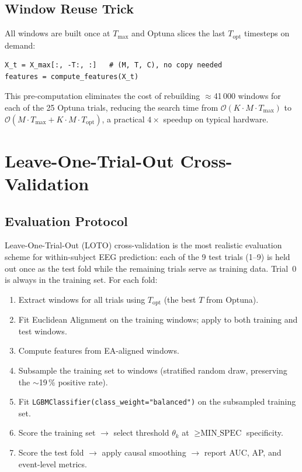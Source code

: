 \documentclass[12pt,a4paper]{article}
\begin{document}
\subsection{Window Reuse Trick}

All windows are built once at $T_{\max}$ and Optuna slices the last
$T_{\text{opt}}$ timesteps on demand:

\begin{lstlisting}[style=pycode]
X_t = X_max[:, -T:, :]   # (M, T, C), no copy needed
features = compute_features(X_t)
\end{lstlisting}

This pre-computation eliminates the cost of rebuilding
$\approx$41\,000 windows for each of the 25 Optuna trials, reducing the
search time from $\mathcal{O}(K \cdot M \cdot T_{\max})$ to
$\mathcal{O}(M \cdot T_{\max} + K \cdot M \cdot T_{\text{opt}})$, a
practical $4\times$ speedup on typical hardware.

\section{Leave-One-Trial-Out Cross-Validation}

\subsection{Evaluation Protocol}

Leave-One-Trial-Out (LOTO) cross-validation is the most realistic
evaluation scheme for within-subject EEG prediction: each of the 9 test
trials (1--9) is held out once as the test fold while the remaining trials
serve as training data. Trial~0 is always in the training set. For each fold:

\begin{enumerate}[leftmargin=1.5em]
  \item Extract windows for all trials using $T_{\text{opt}}$ (the best $T$
        from Optuna).
  \item Fit Euclidean Alignment on the training windows; apply to both
        training and test windows.
  \item Compute features from EA-aligned windows.
  \item Subsample the training set to  windows
        (stratified random draw, preserving the $\sim$19\,\% positive rate).
  \item Fit \texttt{LGBMClassifier(class\_weight="balanced")} on the
        subsampled training set.
  \item Score the training set $\rightarrow$ select threshold $\theta_k$
        at $\geq \text{MIN\_SPEC}$ specificity.
  \item Score the test fold $\rightarrow$ apply causal smoothing
        $\rightarrow$ report AUC, AP, and event-level metrics.
\end{enumerate}
\end{document}
